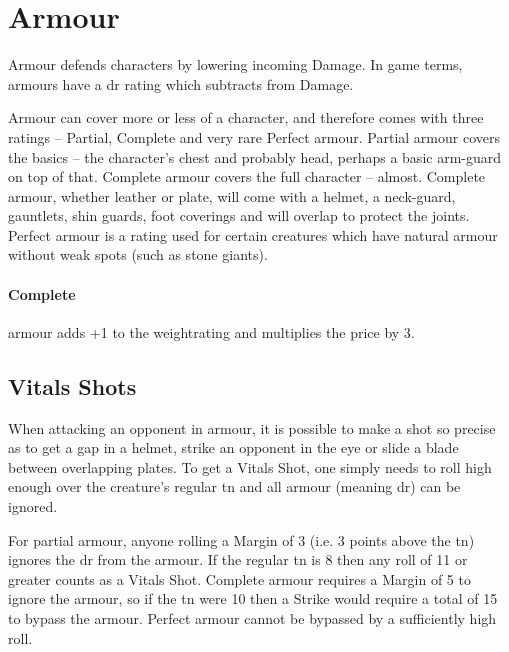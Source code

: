 \section{Armour}

\begin{multicols}{2}

\armourchart

\noindent
Armour defends characters by lowering incoming Damage. In game terms, armours have a \gls{dr} rating which subtracts from Damage.

Armour can cover more or less of a character, and therefore comes with three ratings -- Partial, Complete and very rare Perfect armour.
Partial armour covers the basics -- the character's chest and probably head, perhaps a basic arm-guard on top of that.
Complete armour covers the full character -- almost.
Complete armour, whether leather or plate, will come with a helmet, a neck-guard, gauntlets, shin guards, foot coverings and will overlap to protect the joints.
Perfect armour is a rating used for certain creatures which have natural armour without weak spots (such as stone giants).

\paragraph{Complete} armour adds +1 to the \gls{weightrating} and multiplies the price by 3.

\subsection{Vitals Shots}\label{vitals}


When attacking an opponent in armour, it is possible to make a shot so precise as to get a gap in a helmet, strike an opponent in the eye or slide a blade between overlapping plates. To get a Vitals Shot, one simply needs to roll high enough over the creature's regular \gls{tn} and all armour (meaning \gls{dr}) can be ignored.

For partial armour, anyone rolling a Margin of 3 (i.e. 3 points above the \gls{tn}) ignores the \gls{dr} from the armour. If the regular \gls{tn} is 8 then any roll of 11 or greater counts as a Vitals Shot. Complete armour requires a Margin of 5 to ignore the armour, so if the \gls{tn} were 10 then a Strike would require a total of 15 to bypass the armour. Perfect armour cannot be bypassed by a sufficiently high roll.


\end{multicols}
